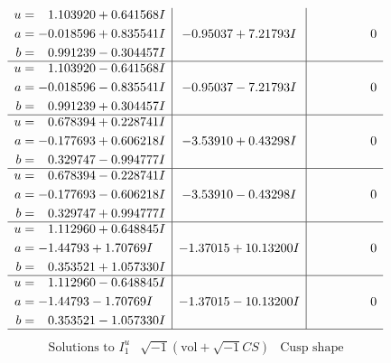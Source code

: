 \documentclass[1p]{elsarticle_modified}
\theoremstyle{definition}
\newcommand{\I}{\sqrt{-1}}
\begin{document}
$$\begin{array}{c|c|c}
\begin{aligned}
u &= \phantom{-}1.103920 + 0.641568 I \\
a &= -0.018596 + 0.835541 I \\
b &= \phantom{-}0.991239 - 0.304457 I\end{aligned}
 & -0.95037 + 7.21793 I & \phantom{-0.000000 } 0 \\ \hline\begin{aligned}
u &= \phantom{-}1.103920 - 0.641568 I \\
a &= -0.018596 - 0.835541 I \\
b &= \phantom{-}0.991239 + 0.304457 I\end{aligned}
 & -0.95037 - 7.21793 I & \phantom{-0.000000 } 0 \\ \hline\begin{aligned}
u &= \phantom{-}0.678394 + 0.228741 I \\
a &= -0.177693 + 0.606218 I \\
b &= \phantom{-}0.329747 - 0.994777 I\end{aligned}
 & -3.53910 + 0.43298 I & \phantom{-0.000000 } 0 \\ \hline\begin{aligned}
u &= \phantom{-}0.678394 - 0.228741 I \\
a &= -0.177693 - 0.606218 I \\
b &= \phantom{-}0.329747 + 0.994777 I\end{aligned}
 & -3.53910 - 0.43298 I & \phantom{-0.000000 } 0 \\ \hline\begin{aligned}
u &= \phantom{-}1.112960 + 0.648845 I \\
a &= -1.44793 + 1.70769 I \\
b &= \phantom{-}0.353521 + 1.057330 I\end{aligned}
 & -1.37015 + 10.13200 I & \phantom{-0.000000 } 0 \\ \hline\begin{aligned}
u &= \phantom{-}1.112960 - 0.648845 I \\
a &= -1.44793 - 1.70769 I \\
b &= \phantom{-}0.353521 - 1.057330 I\end{aligned}
 & -1.37015 - 10.13200 I & \phantom{-0.000000 } 0\\
 \hline 
 \end{array}$$\newpage$$\begin{array}{c|c|c}  
\text{Solutions to }I^u_{1}& \I (\text{vol} + \sqrt{-1}CS) & \text{Cusp shape}\\
 \hline 
\begin{aligned}

\end{aligned}
\end{array}$$
\end{document}
